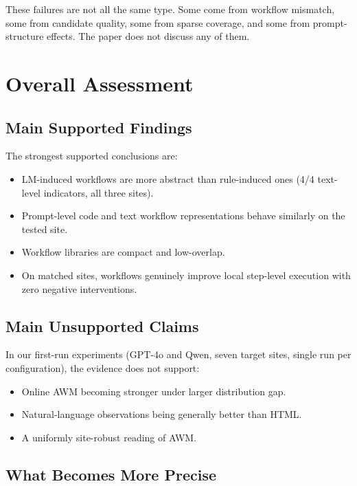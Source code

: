\documentclass{article}
\providecommand{\tightlist}{%
  \setlength{\itemsep}{0pt}\setlength{\parskip}{0.8em}}
\begin{document}
These failures are not all the same type. Some come from workflow
mismatch, some from candidate quality, some from sparse coverage, and
some from prompt-structure effects. The paper does not discuss any of
them.

\section{Overall Assessment}\label{overall-assessment}

\subsection{Main Supported Findings}\label{what-is-reproduced}

The strongest supported conclusions are:

\begin{itemize}
\tightlist
\item
  LM-induced workflows are more abstract than rule-induced ones (4/4
  text-level indicators, all three sites).
\item
  Prompt-level code and text workflow representations behave similarly
  on the tested site.
\item
  Workflow libraries are compact and low-overlap.
\item
  On matched sites, workflows genuinely improve local step-level
  execution with zero negative interventions.
\end{itemize}

\subsection{Main Unsupported
Claims}\label{what-is-not-reproduced}

In our first-run experiments (GPT-4o and Qwen, seven target sites,
single run per configuration), the evidence does not support:

\begin{itemize}
\tightlist
\item
  Online AWM becoming stronger under larger distribution gap.
\item
  Natural-language observations being generally better than HTML.
\item
  A uniformly site-robust reading of AWM.
\end{itemize}

\subsection{What Becomes More
Precise}\label{what-becomes-more-precise}
\end{document}
